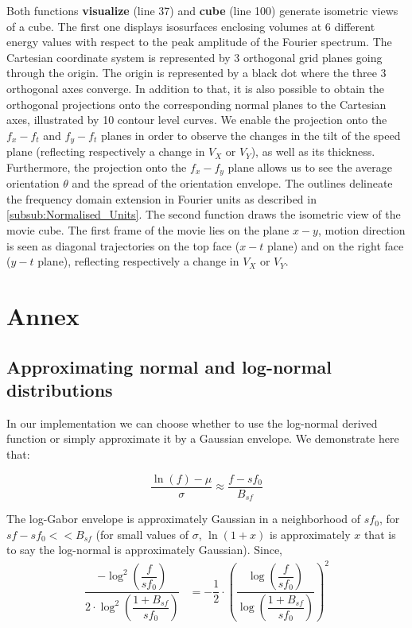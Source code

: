 \documentclass[a4paper,11pt]{article}%
\begin{document}
Both functions \textbf{visualize} (line 37) and \textbf{cube} (line 100) generate isometric views of a cube. The first one displays isosurfaces enclosing volumes at 6 different energy values with respect to the peak amplitude of the Fourier spectrum. The Cartesian coordinate system is represented by 3 orthogonal grid planes going through the origin. The origin is represented by a black dot where the three 3 orthogonal axes converge. In addition to that, it is also possible to obtain the orthogonal projections onto the corresponding normal planes to the Cartesian axes, illustrated by 10 contour level curves. We enable the projection onto the $f_x-f_t$ and $f_y-f_t$ planes in order to observe the changes in the tilt of the speed plane (reflecting respectively a change in $V_X$ or $V_Y$), as well as its thickness. Furthermore, the projection onto the $f_x-f_y$ plane allows us to see the average orientation $\theta$ and the spread of the orientation envelope. The outlines delineate the frequency domain extension in Fourier units as described in \ref{subsub:Normalised_Units}. The second function draws the isometric view of the movie cube. The first frame of the movie lies on the plane $x-y$, motion direction is seen as diagonal trajectories on the top face ($x-t$ plane) and on the right face ($y-t$ plane), reflecting respectively a change in $V_X$ or $V_Y$. %
 


\appendix
\section{Annex}
\subsection{Approximating normal and log-normal distributions}
\label{appendix:Approximating distributions}

In our implementation we can choose whether to use the log-normal derived function or simply approximate it by a Gaussian envelope. We demonstrate here that:

 \[
 \dfrac{\ln(f) -\mu}{\sigma} \approx \dfrac{f -sf_{0}}{B_{sf}}
 \]
 
The log-Gabor envelope is approximately Gaussian in a neighborhood of $sf_{0}$, for $sf-sf_{0} << B_{sf}$ (for small values of $\sigma$, $\ln(1+x)$ is approximately $x$ that is to say the log-normal is approximately Gaussian).  
Since,
\begin{align}
 \dfrac{-\log^{2}\left(\dfrac{f}{sf_{0}}\right)}{2\cdot\log^{2} \left( \dfrac{1+B_{sf}}{sf_{0}} \right)} &= -\dfrac{1}{2} \cdot \left( \dfrac{\log \left (\dfrac{f}{sf_{0}}\right)}{\log\left(\dfrac{1+B_{sf}}{sf_{0}}\right)}\right)^{2}
\end{align}
 
\end{document}
